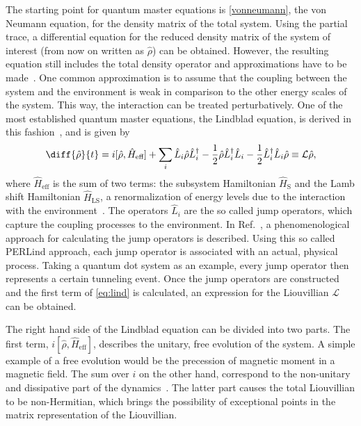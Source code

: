 \documentclass[../main.tex]{subfiles}
\begin{document}
The starting point for quantum master equations is \cref{vonneumann}, the von Neumann equation, for the density matrix of the total system. Using the partial trace, a differential equation for the reduced density matrix of the system of interest (from now on written as $\hat\rho$) can be obtained. However, the resulting equation still includes the total density operator and approximations have to be made~\cite{lindblad}. One common approximation is to assume that the coupling between the system and the environment is weak in comparison to the other energy scales of the system. This way, the interaction can be treated perturbatively. One of the most established quantum master equations, the Lindblad equation, is derived in this fashion~\cite{lindorigin}, and is given by
\begin{equation}\label{eq:lind}
    \diff{\hat\rho}{t} = i[\hat\rho, \hat H_\text{eff}] + \sum_i \hat L_i\hat\rho\hat L_i^\dag - \frac{1}{2}\hat\rho\hat L_i^\dag\hat L_i - \frac{1}{2}\hat L_i^\dag\hat L_i \hat\rho \equiv \mathcal{L}\hat\rho,
\end{equation}
where $\hat H_\text{eff}$ is the sum of two terms: the subsystem Hamiltonian $\hat H_\text{S}$ and the Lamb shift Hamiltonian $\hat H_\text{LS}$, a renormalization of energy levels due to the interaction with the environment~\cite{lindblad}. The operators $\hat L_i$ are the so called jump operators, which capture the coupling processes to the environment. In Ref.~\cite{perlind}, a phenomenological approach for calculating the jump operators is described. Using this so called PERLind approach, each jump operator is associated with an actual, physical process. Taking a quantum dot system as an example, every jump operator then represents a certain tunneling event. Once the jump operators are constructed and the first term of \cref{eq:lind} is calculated, an expression for the Liouvillian $\mathcal{L}$ can be obtained. 

The right hand side of the Lindblad equation can be divided into two parts. The first term, $i[\hat\rho, \hat H_\text{eff}]$, describes the unitary, free evolution of the system. A simple example of a free evolution would be the precession of magnetic moment in a magnetic field. The sum over $i$ on the other hand, correspond to the non-unitary and dissipative part of the dynamics~\cite{bookopen}. The latter part causes the total Liouvillian to be non-Hermitian, which brings the possibility of exceptional points in the matrix representation of the Liouvillian.

\end{document}
